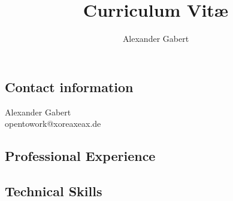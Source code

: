 \documentclass[a4paper]{report}
\begin{document}
\title{Curriculum Vitæ}
\author{Alexander Gabert}
\maketitle

\begin{flushleft}
\section*{Contact information}
\end{flushleft}

\begin{flushleft}
Alexander Gabert\\
opentowork@xoreaxeax.de\\
\end{flushleft}

\begin{flushleft}
\section*{Professional Experience}
\end{flushleft}

\subsection*{Technical Skills}
\end{document}
